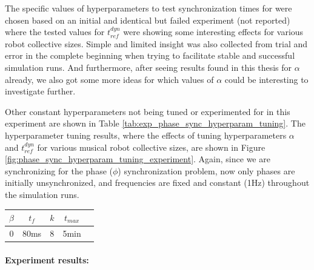 		The specific values of hyperparameters to test synchronization times for were chosen based on an initial and identical but failed experiment (not reported) where the tested values for $t_{ref}^{dyn}$ were showing some interesting effects for various robot collective sizes. Simple and limited insight was also collected from trial and error in the complete beginning when trying to facilitate stable and successful simulation runs. And furthermore, after seeing results found in this thesis for $\alpha$ already, we also got some more ideas for which values of $\alpha$ could be interesting to investigate further.
		
		Other constant hyperparameters not being tuned or experimented for in this experiment are shown in Table \ref{tab:exp_phase_sync_hyperparam_tuning}. The hyperparameter tuning results, where the effects of tuning hyperparameters $\alpha$ and $t_{ref}^{dyn}$ for various musical robot collective sizes, are shown in Figure \ref{fig:phase_sync_hyperparam_tuning_experiment}. Again, since we are synchronizing for the phase ($\phi$) synchronization problem, now only phases are initially unsynchronized, and frequencies are fixed and constant (1Hz) throughout the simulation runs.
		
		\begin{center}
		\begin{tabular}{ |c|c|c|c|c| } 
		\hline
		$\beta$ & $t_f$ & $k$ & $t_{max}$ \\
		\hline
		0 & 80ms & 8 & 5min \\
		\hline
		\end{tabular}
		\label{tab:exp_phase_sync_hyperparam_tuning}
		\end{center}
		
		\paragraph{Experiment results:\nl}
		
